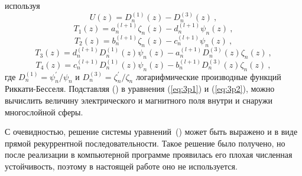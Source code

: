используя
\begin{equation*}
  U(z) =    {D^{(1)}_{n}}(z) - {D^{(3)}_{n}}(z)\:,
\end{equation*}
\begin{equation*}
  T_1(z) =   a^{(l+1)}_{n}  \zeta_{n}(z) 
           - d^{(l+1)}_{n}  \psi_{n}(z)\:,
\end{equation*}
\begin{equation*}
  T_2(z) =   b^{(l+1)}_{n}  \zeta_{n}(z) 
           - c^{(l+1)}_{n}  \psi_{n}(z)\:,
\end{equation*}
\begin{equation*}
  T_3(z) =  d^{(l+1)}_{n}  D^{(1)}_{n}(z)  \psi_{n}(z) 
          - a^{(l+1)}_{n}  D^{(3)}_{n}(z)  \zeta_{n} (z)\:,
\end{equation*}
\begin{equation*}
  T_4(z) =  c^{(l+1)}_{n}  D^{(1)}_{n}(z)  \psi_{n}(z) 
          - b^{(l+1)}_{n}  D^{(3)}_{n}(z)  \zeta_{n} (z)\:,
\end{equation*}
где  $D^{(1)}_{n} = \psi^{\prime}_{n}/\psi_{n}$ и
$D^{(3)}_{n} = \zeta^{\prime}_{n}/\zeta_{n}$ логарифмические
производные функций Риккати-Бесселя. Подставляя
() в уравнения (\ref{eq:3p1}) и
(\ref{eq:3p2}), можно вычислить величину электрического и магнитного
поля внутри и снаружи многослойной сферы.

С очевидностью, решение системы
уравнений~() может быть
выражено и в виде прямой рекуррентной последовательности. Такое решение было
получено, но после реализации в компьютерной программе проявилась
его плохая численная устойчивость, поэтому в настоящей работе
оно не используется.

